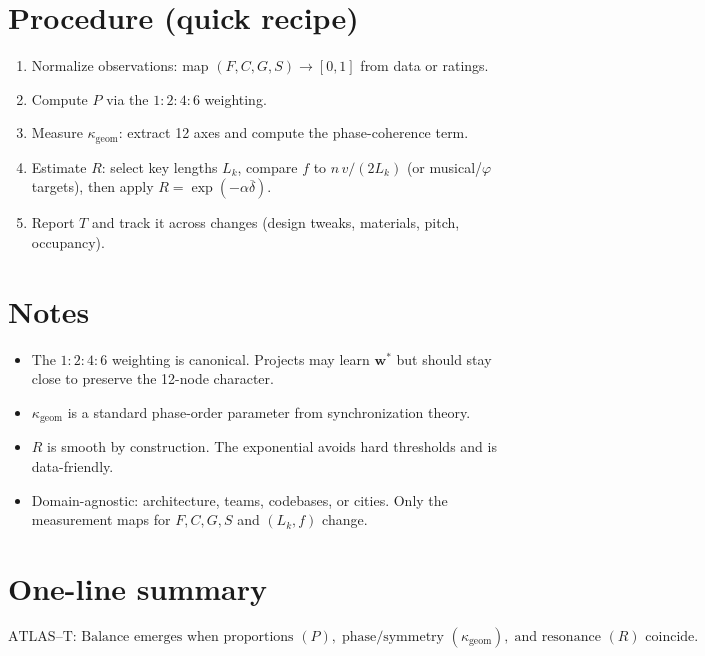 \documentclass[11pt]{article}
\begin{document}
\section*{Procedure (quick recipe)}
\begin{enumerate}[leftmargin=*, itemsep=2pt]
  \item Normalize observations: map $(F,C,G,S)\to[0,1]$ from data or ratings.
  \item Compute $P$ via the $1{:}2{:}4{:}6$ weighting.
  \item Measure $\kappa_{\mathrm{geom}}$: extract 12 axes and compute the phase-coherence term.
  \item Estimate $R$: select key lengths $L_k$, compare $f$ to $n\,v/(2L_k)$ (or musical/$\varphi$ targets), then apply $R=\exp(-\alpha\overline{\delta})$.
  \item Report $T$ and track it across changes (design tweaks, materials, pitch, occupancy).
\end{enumerate}

\section*{Notes}
\begin{itemize}[leftmargin=*, itemsep=2pt]
  \item The $1{:}2{:}4{:}6$ weighting is canonical. Projects may learn $\mathbf w^\ast$ but should stay close to preserve the 12-node character.
  \item $\kappa_{\mathrm{geom}}$ is a standard phase-order parameter from synchronization theory.
  \item $R$ is smooth by construction. The exponential avoids hard thresholds and is data-friendly.
  \item Domain-agnostic: architecture, teams, codebases, or cities. Only the measurement maps for $F,C,G,S$ and $(L_k,f)$ change.
\end{itemize}

\section*{One-line summary}
\[
\text{ATLAS--T: Balance emerges when proportions }(P),\; \text{phase/symmetry }(\kappa_{\mathrm{geom}}),\;
\text{and resonance }(R) \text{ coincide.}
\]
\end{document}
